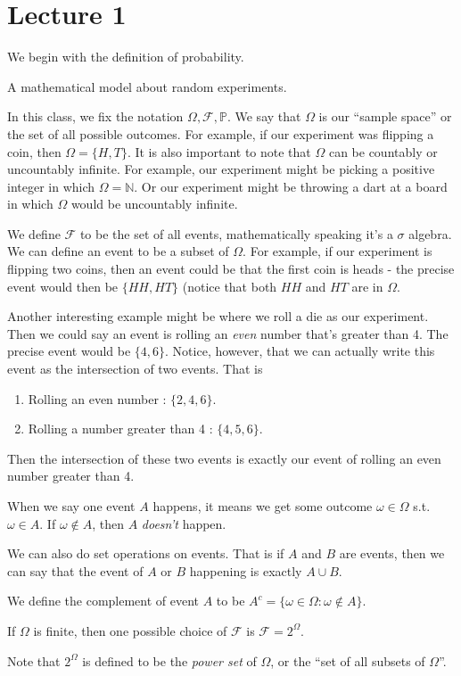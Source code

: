 \documentclass[notitlepage,abstract=on,twoside=semi]{scrartcl}
\newcommand{\N}{\ensuremath{\mathbb{N}}}
\newcommand{\om}{\ensuremath{\Omega}}
\newcommand{\F}{\ensuremath{\mathcal{F}}}
\newcommand{\Prob}{\ensuremath{\mathbb{P}}}
\begin{document}
\section{Lecture 1}
We begin with the definition of probability.
\begin{definition}
  \label{1/5:1}
  A mathematical model about random experiments.
\end{definition}
In this class, we fix the notation $\om, \F, \Prob$. We say that $\om$ is our
``sample space'' or the set of all possible outcomes. For example, if our
experiment was flipping a coin, then $\om = \{H, T\}$. It is also important to
note that $\om$ can be countably or uncountably infinite. For example, our
experiment might be picking a positive integer in which $\om = \N$. Or our
experiment might be throwing a dart at a board in which $\om$ would be
uncountably infinite.

We define $\F$ to be the set of all events, mathematically speaking it's a
$\sigma$ algebra. We can define an event to be a subset of $\om$. For example,
if our experiment is flipping two coins, then an event could be that the first
coin is heads - the precise event would then be $\{HH, HT\}$ (notice that both
$HH$ and $HT$ are in $\om$.

Another interesting example might be where we roll a die as our
experiment. Then we could say an event is rolling an \textit{even} number
that's greater than 4. The precise event would be $\{4, 6\}$. Notice, however,
that we can actually write this event as the intersection of two events. That
is
\begin{enumerate}
\item Rolling an even number : $\{2,4,6\}$.
\item Rolling a number greater than 4 : $\{4,5,6\}$.
\end{enumerate}
Then the intersection of these two events is exactly our event of rolling an
even number greater than 4.
\begin{remark}
  When we say one event $A$ happens, it means we get some outcome $\omega \in
  \om$ s.t. $\omega \in A$. If $\omega \not \in A$, then $A$ \textit{doesn't}
  happen.
\end{remark}
\begin{remark}
  We can also do set operations on events. That is if $A$ and $B$ are events,
  then we can say that the event of $A$ or $B$ happening is exactly $A \cup B$.
\end{remark}
\begin{definition}
  We define the complement of event $A$ to be $A^{c} = \{\omega \in \om :
  \omega \not \in A\}$.
\end{definition}
\begin{remark}
  If $\om$ is finite, then one possible choice of $\F$ is $\F = 2^{\om}$.
\end{remark}
Note that $2^{\om}$ is defined to be the \textit{power set} of $\om$, or the
``set of all subsets of $\om$''.
\end{document}
